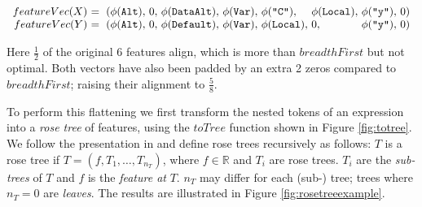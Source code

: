 \begin{small}
  \begin{equation}\label{eq:flattened}
    \begin{array}{r@{}l@{}l@{}l@{}l@{}l@{}l@{}l@{}l@{}l}
      featureVec(X)\ &=\ (\feature{\CAlt},\ &0,\ &\feature{\CDataAlt},\ &\feature{\CVar},\ &\feature{\id{C}},\  &\feature{\CLocal},\ &\feature{\id{y}},\ &0 &) \\
      featureVec(Y)\ &=\ (\feature{\CAlt},\ &0,\ &\feature{\CDefault},\ &\feature{\CVar},\ &\feature{\CLocal},\ &0,\                 &\feature{\id{y}},\ &0 &)
    \end{array}
  \end{equation}
\end{small}

Here $\frac{1}{2}$ of the original 6 features align, which is more than $breadthFirst$ but not optimal. Both vectors have also been padded by an extra 2 zeros compared to $breadthFirst$; raising their alignment to $\frac{5}{8}$.

To perform this flattening we first transform the nested tokens of an expression into a \emph{rose tree} of features, using the $toTree$ function shown in Figure \ref{fig:totree}. We follow the presentation in \cite{blundell2012bayesian} and define rose trees recursively as follows: $T$ is a rose tree if $T = (f, T_1, \dots, T_{n_T})$, where $f \in \mathbb{R}$ and $T_i$ are rose trees. $T_i$ are the \emph{sub-trees} of $T$ and $f$ is the \emph{feature at} $T$. $n_T$ may differ for each (sub-) tree; trees where $n_T = 0$ are \emph{leaves}. The results are illustrated in Figure \ref{fig:rosetreeexample}.

